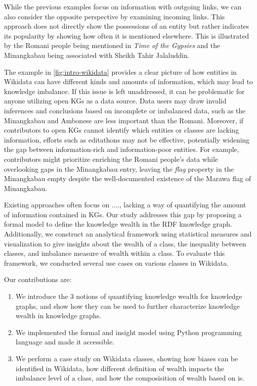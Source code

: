 While the previous examples focus on information with outgoing links, we can also consider the opposite perspective by examining incoming links. This approach does not directly show the possessions of an entity but rather indicates its popularity by showing how often it is mentioned elsewhere. This is illustrated by the Romani people being mentioned in \textit{Time of the Gypsies} and the Minangkabau being associated with Sheikh Tahir Jalaluddin.

The example in \autoref{fig:intro-wikidata} provides a clear picture of how entities in Wikidata can have different kinds and amounts of information, which may lead to knowledge imbalance. If this issue is left unaddressed, it can be problematic for anyone utilizing open KGs as a data source. Data users may draw invalid inferences and conclusions based on incomplete or imbalanced data, such as the Minangkabau and Ambonese are less important than the Romani. Moreover, if contributors to open KGs cannot identify which entities or classes are lacking information, efforts such as editathons may not be effective, potentially widening the gap between information-rich and information-poor entities. For example, contributors might prioritize enriching the Romani people's data while overlooking gaps in the Minangkabau entry, leaving the \textit{flag} property in the Minangkabau empty despite the well-documented existence of the Marawa flag of Minangkabau.

Existing approaches often focus on ...., lacking a way of quantifying the amount of information contained in KGs. Our study addresses this gap by proposing a formal model to define the knowledge wealth in the RDF knowledge graph. Additionally, we construct an analytical framework using statistical measures and visualization to give insights about the wealth of a class, the inequality between classes, and imbalance measure of wealth within a class. To evaluate this framework, we conducted several use cases on various classes in Wikidata.

Our contributions are:
\begin{enumerate}
    \item We introduce the 3 notions of quantifying knowledge wealth for knowledge graphs, and show how they can be used to further characterize knowledge wealth in knowledge graphs.
    \item We implemented the formal and insight model using Python programming language and made it accessible.
    \item We perform a case study on Wikidata classes, showing how biases can be identified in Wikidata, how different definition of wealth impacts the imbalance level of a class, and how the composisition of wealth based on is.
\end{enumerate}